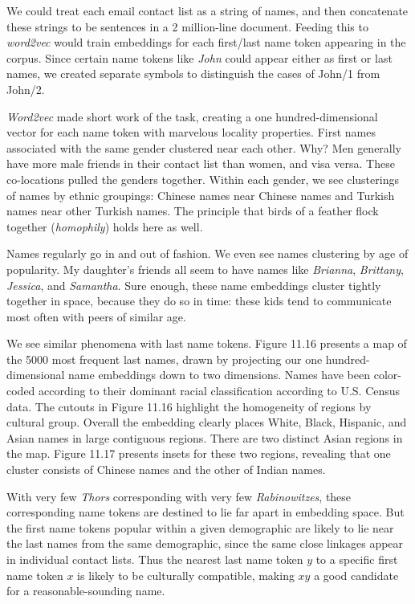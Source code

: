 \documentclass[10pt]{article}
\begin{document}
\begin{enumerate}
We could treat each email contact list as a string of names, and then concatenate these strings to be sentences in a 2 million-line document. Feeding this to \textit{word2vec} would train embeddings for each first/last name token appearing in the corpus. Since certain name tokens like \textit{John} could appear either as first or last names, we created separate symbols to distinguish the cases of John/1 from John/2.

\textit{Word2vec} made short work of the task, creating a one hundred-dimensional vector for each name token with marvelous locality properties. First names associated with the same gender clustered near each other. Why? Men generally have more male friends in their contact list than women, and visa versa. These co-locations pulled the genders together. Within each gender, we see clusterings of names by ethnic groupings: Chinese names near Chinese names and Turkish names near other Turkish names. The principle that birds of a feather flock together (\textit{homophily}) holds here as well.

Names regularly go in and out of fashion. We even see names clustering by age of popularity. My daughter's friends all seem to have names like \textit{Brianna}, \textit{Brittany}, \textit{Jessica}, and \textit{Samantha}. Sure enough, these name embeddings cluster tightly together in space, because they do so in time: these kids tend to communicate most often with peers of similar age.

We see similar phenomena with last name tokens. Figure 11.16 presents a map of the 5000 most frequent last names, drawn by projecting our one hundred-dimensional name embeddings down to two dimensions. Names have been color-coded according to their dominant racial classification according to U.S. Census data. The cutouts in Figure 11.16 highlight the homogeneity of regions by cultural group. Overall the embedding clearly places White, Black, Hispanic, and Asian names in large contiguous regions. There are two distinct Asian regions in the map. Figure 11.17 presents insets for these two regions, revealing that one cluster consists of Chinese names and the other of Indian names.

With very few \textit{Thors} corresponding with very few \textit{Rabinowitzes}, these corresponding name tokens are destined to lie far apart in embedding space. But the first name tokens popular within a given demographic are likely to lie near the last names from the same demographic, since the same close linkages appear in individual contact lists. Thus the nearest last name token $y$ to a specific first name token $x$ is likely to be culturally compatible, making $xy$ a good candidate for a reasonable-sounding name.


\end{enumerate}
\end{document}
